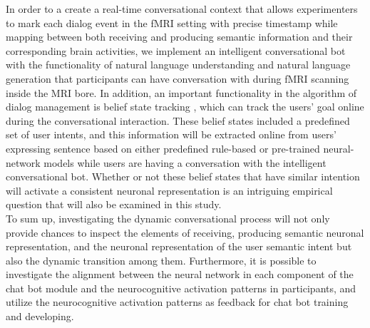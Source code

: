 \documentclass[man, floatsintext, draftfirst]{apa6}
\begin{document}
In order to a create a real-time conversational context that allows experimenters to mark each dialog event in the fMRI setting with precise timestamp while mapping between both receiving and producing semantic information and their corresponding brain activities, we implement an intelligent conversational bot with the functionality of natural language understanding and natural language generation that participants can have conversation with during fMRI scanning inside the MRI bore. In addition, an important functionality in the algorithm of dialog management is belief state tracking \parencites{Young2013}{wen2016network}{Hakkani-Tur2016}{YangCHCLGD16}{chen2016}{ChenHTCGD16}{wen2017latent}, which can track the users’ goal online during the conversational interaction. These belief states included a predefined set of user intents, and this information will be extracted online from users’ expressing sentence based on either predefined rule-based or pre-trained neural-network models while users are having a conversation with the intelligent conversational bot. Whether or not these belief states that have similar intention will activate a consistent neuronal representation is an intriguing empirical question that will also be examined in this study.\\

To sum up, investigating the dynamic conversational process will not only provide chances to inspect the elements of receiving, producing semantic neuronal representation, and the neuronal representation of the user semantic intent but also the dynamic transition among them. Furthermore, it is possible to investigate the alignment between the neural network in each component of the chat bot module and the neurocognitive activation patterns in participants, and utilize the neurocognitive activation patterns as feedback for chat bot training and developing.\\

\end{document}
